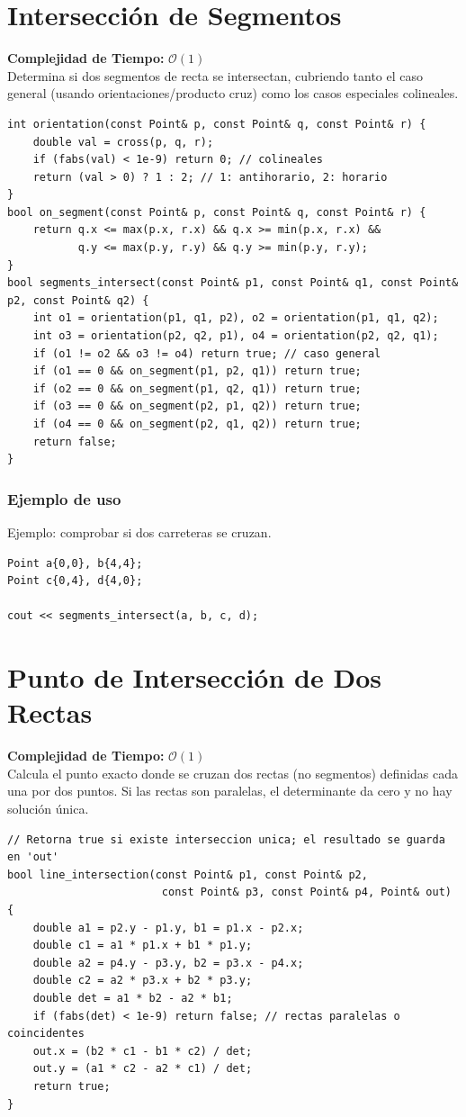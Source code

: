 \documentclass[10pt,twocolumn,letterpaper]{report}
\begin{document}
\section{Intersección de Segmentos}
\textbf{Complejidad de Tiempo:} $\mathcal{O}(1)$ \\
Determina si dos segmentos de recta se intersectan, cubriendo tanto el caso general (usando orientaciones/producto cruz) como los casos especiales colineales.
\begin{lstlisting}
int orientation(const Point& p, const Point& q, const Point& r) {
    double val = cross(p, q, r);
    if (fabs(val) < 1e-9) return 0; // colineales
    return (val > 0) ? 1 : 2; // 1: antihorario, 2: horario
}
bool on_segment(const Point& p, const Point& q, const Point& r) {
    return q.x <= max(p.x, r.x) && q.x >= min(p.x, r.x) &&
           q.y <= max(p.y, r.y) && q.y >= min(p.y, r.y);
}
bool segments_intersect(const Point& p1, const Point& q1, const Point& p2, const Point& q2) {
    int o1 = orientation(p1, q1, p2), o2 = orientation(p1, q1, q2);
    int o3 = orientation(p2, q2, p1), o4 = orientation(p2, q2, q1);
    if (o1 != o2 && o3 != o4) return true; // caso general
    if (o1 == 0 && on_segment(p1, p2, q1)) return true;
    if (o2 == 0 && on_segment(p1, q2, q1)) return true;
    if (o3 == 0 && on_segment(p2, p1, q2)) return true;
    if (o4 == 0 && on_segment(p2, q1, q2)) return true;
    return false;
}
\end{lstlisting}
\subsubsection*{Ejemplo de uso}
Ejemplo: comprobar si dos carreteras se cruzan.
\begin{lstlisting}
Point a{0,0}, b{4,4};
Point c{0,4}, d{4,0};

cout << segments_intersect(a, b, c, d);
\end{lstlisting}

\section{Punto de Intersección de Dos Rectas}
\textbf{Complejidad de Tiempo:} $\mathcal{O}(1)$ \\
Calcula el punto exacto donde se cruzan dos rectas (no segmentos) definidas cada una por dos puntos. Si las rectas son paralelas, el determinante da cero y no hay solución única.
\begin{lstlisting}
// Retorna true si existe interseccion unica; el resultado se guarda en 'out'
bool line_intersection(const Point& p1, const Point& p2,
                        const Point& p3, const Point& p4, Point& out) {
    double a1 = p2.y - p1.y, b1 = p1.x - p2.x;
    double c1 = a1 * p1.x + b1 * p1.y;
    double a2 = p4.y - p3.y, b2 = p3.x - p4.x;
    double c2 = a2 * p3.x + b2 * p3.y;
    double det = a1 * b2 - a2 * b1;
    if (fabs(det) < 1e-9) return false; // rectas paralelas o coincidentes
    out.x = (b2 * c1 - b1 * c2) / det;
    out.y = (a1 * c2 - a2 * c1) / det;
    return true;
}
\end{lstlisting}
\end{document}
